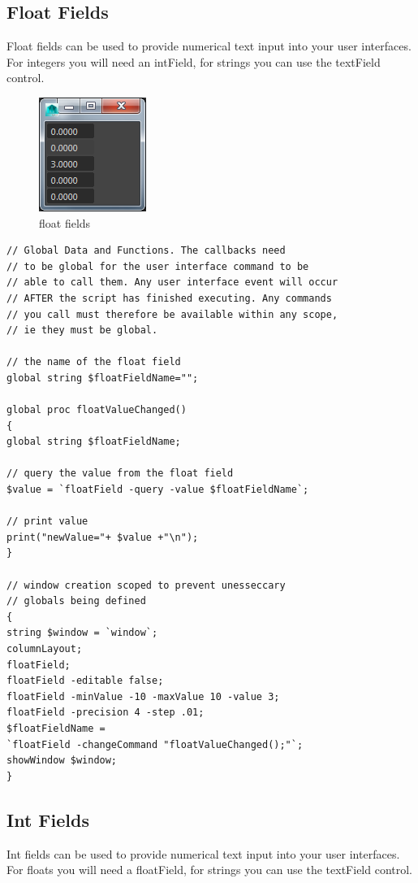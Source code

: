 \subsection{Float Fields}
Float fields can be used to provide numerical text input into your user interfaces. For integers you will need an intField, for strings you can use the textField control.

\begin{figure}[tbh]
	\centering
	\includegraphics[width=0.3\linewidth]{figures/GUI/floatFields}
	\caption{float fields}
	\label{fig:floatfields}
\end{figure}

\begin{lstlisting}
// Global Data and Functions. The callbacks need
// to be global for the user interface command to be 
// able to call them. Any user interface event will occur
// AFTER the script has finished executing. Any commands
// you call must therefore be available within any scope,
// ie they must be global.

// the name of the float field 
global string $floatFieldName=""; 

global proc floatValueChanged() 
{
global string $floatFieldName;

// query the value from the float field
$value = `floatField -query -value $floatFieldName`;

// print value
print("newValue="+ $value +"\n");
}

// window creation scoped to prevent unesseccary
// globals being defined
{
string $window = `window`;
columnLayout;
floatField;
floatField -editable false;
floatField -minValue -10 -maxValue 10 -value 3;
floatField -precision 4 -step .01;
$floatFieldName =
`floatField -changeCommand "floatValueChanged();"`;
showWindow $window;
}
\end{lstlisting}

\subsection{Int Fields}
Int fields can be used to provide numerical text input into your user interfaces. For floats you will need a floatField, for strings you can use the textField control.

